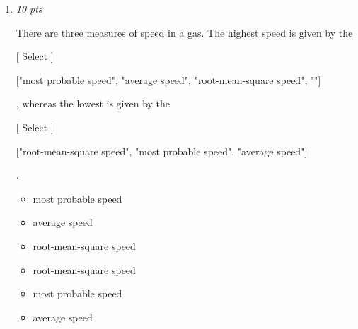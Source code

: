 \documentclass[11pt]{article}
\begin{document}
\begin{enumerate}[leftmargin=*,label=\textbf{Question \arabic*.}]
    [ Select ]

  ["relative to gas B requires more information.", "is higher than that of gas B.", "is the same as that of gas B.", "is lower than that of gas B."]

 Further, the rms speed of the molecules of gas A

    [ Select ]

  ["is larger than that of gas B.", "is the same as that of gas B.", "is impossible to determine relative gas B without more information.", "is smaller than that of gas B."]

\begin{itemize}
  \item relative to gas B requires more information.
  \item is higher than that of gas B.
  \item is the same as that of gas B.
  \item is lower than that of gas B.
  \item is larger than that of gas B.
  \item is the same as that of gas B.
  \item is impossible to determine relative gas B without more information.
  \item is smaller than that of gas B.
\end{itemize}

\item \hfill \textit{10 pts}

There are three measures of speed in a gas. The highest speed is given by the

    [ Select ]

  ["most probable speed", "average speed", "root-mean-square speed", ""]

, whereas the lowest is given by the

    [ Select ]

  ["root-mean-square speed", "most probable speed", "average speed"]

.

\begin{itemize}
  \item most probable speed
  \item average speed
  \item root-mean-square speed
  \item root-mean-square speed
  \item most probable speed
  \item average speed
\end{itemize}

\end{enumerate}
\end{document}
